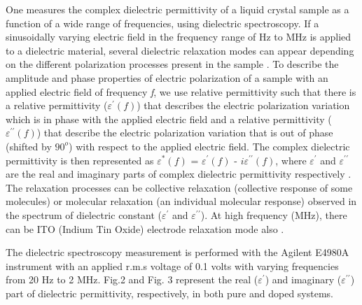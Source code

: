 \documentclass[reprint,amsfonts,amsmath,amssymb,aps,pre,floatfix,10pt]{revtex4-1}
\begin{document}
One measures the complex dielectric permittivity of a liquid crystal sample as a function of a wide range of frequencies, using dielectric spectroscopy. If a sinusoidally varying electric field in the frequency range of Hz to MHz is applied to a dielectric material, several dielectric relaxation modes can appear depending on the different polarization processes present in the sample \cite{patranabish2021quantum_38}. To describe the amplitude and phase properties of electric polarization of a sample with an applied electric field of frequency \textit{f}, we use relative permittivity such that there is a relative permittivity ($\varepsilon^{\prime}(f)$) that describes the electric polarization variation which is in phase with the applied electric field and a relative permittivity ($\varepsilon^{\prime\prime}(f)$) that describe the electric polarization variation that is out of phase (shifted by $90^o$) with respect to the applied electric field. The complex dielectric permittivity is then represented as $\varepsilon^{\ast}(f)$ = $\varepsilon^{\prime}(f)$ - $i\varepsilon^{\prime\prime}(f)$, where $\varepsilon^{\prime}$ and $\varepsilon^{\prime\prime}$ are the real and imaginary parts of complex dielectric permittivity respectively \cite{haase2013relaxation_43}. The relaxation processes can be collective relaxation (collective response of some molecules) or molecular relaxation (an individual molecular response) observed in the spectrum of dielectric constant ($\varepsilon^\prime$ and $\varepsilon^{\prime\prime}$). At high frequency (MHz), there can be ITO (Indium Tin Oxide) electrode relaxation mode also \cite{patranabish2021quantum_38}.

The dielectric spectroscopy measurement is performed with the Agilent E4980A instrument with an applied r.m.s voltage of 0.1 volts with varying frequencies from 20 Hz to 2 MHz. Fig.2 and Fig. 3 represent the real ($\varepsilon^\prime$) and imaginary ($\varepsilon^{\prime\prime}$) part of dielectric permittivity, respectively, in both pure and doped systems. 
\end{document}
